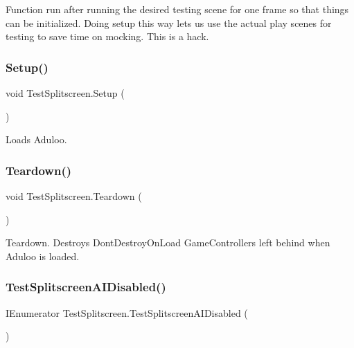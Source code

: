 Function run after running the desired testing scene for one frame so that things can be initialized. Doing setup this way lets us use the actual play scenes for testing to save time on mocking. This is a hack. 

\mbox{\label{class_test_splitscreen_a2bbadc0dfb0f6e6475b20bea58cbe36e}} 
\subsubsection{\texorpdfstring{Setup()}{Setup()}}
{\footnotesize\ttfamily void Test\+Splitscreen.\+Setup (\begin{DoxyParamCaption}{ }\end{DoxyParamCaption})}



Loads Aduloo. 

\mbox{\label{class_test_splitscreen_ab0295bf280db9a3c4b638d8cf0d83cb2}} 
\subsubsection{\texorpdfstring{Teardown()}{Teardown()}}
{\footnotesize\ttfamily void Test\+Splitscreen.\+Teardown (\begin{DoxyParamCaption}{ }\end{DoxyParamCaption})}



Teardown. Destroys Dont\+Destroy\+On\+Load Game\+Controllers left behind when Aduloo is loaded. 

\mbox{\label{class_test_splitscreen_a24f4aefda2ea64efd8507bfa6e566253}} 
\subsubsection{\texorpdfstring{Test\+Splitscreen\+A\+I\+Disabled()}{TestSplitscreenAIDisabled()}}
{\footnotesize\ttfamily I\+Enumerator Test\+Splitscreen.\+Test\+Splitscreen\+A\+I\+Disabled (\begin{DoxyParamCaption}{ }\end{DoxyParamCaption})}



